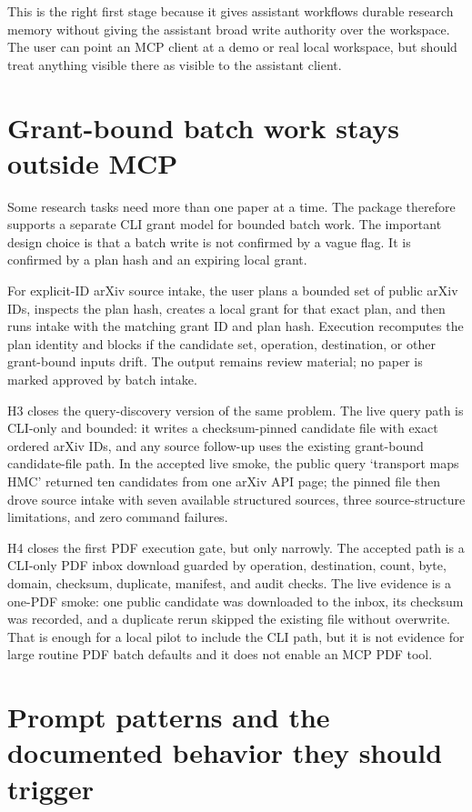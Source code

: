 \documentclass[11pt,a4paper,openany]{book}
\begin{document}
This is the right first stage because it gives assistant workflows durable
research memory without giving the assistant broad write authority over the
workspace. The user can point an MCP client at a demo or real local workspace,
but should treat anything visible there as visible to the assistant client.

\section{Grant-bound batch work stays outside MCP}

Some research tasks need more than one paper at a time. The package therefore
supports a separate CLI grant model for bounded batch work. The important design
choice is that a batch write is not confirmed by a vague flag. It is confirmed
by a plan hash and an expiring local grant.

For explicit-ID arXiv source intake, the user plans a bounded set of public
arXiv IDs, inspects the plan hash, creates a local grant for that exact plan, and
then runs intake with the matching grant ID and plan hash. Execution recomputes
the plan identity and blocks if the candidate set, operation, destination, or
other grant-bound inputs drift. The output remains review material; no paper is
marked approved by batch intake.

H3 closes the query-discovery version of the same problem. The live query path is
CLI-only and bounded: it writes a checksum-pinned candidate file with exact
ordered arXiv IDs, and any source follow-up uses the existing grant-bound
candidate-file path. In the accepted live smoke, the public query
`transport maps HMC' returned ten candidates from one arXiv API page; the pinned
file then drove source intake with seven available structured sources, three
source-structure limitations, and zero command failures.

H4 closes the first PDF execution gate, but only narrowly. The accepted path is a
CLI-only PDF inbox download guarded by operation, destination, count, byte,
domain, checksum, duplicate, manifest, and audit checks. The live evidence is a
one-PDF smoke: one public candidate was downloaded to the inbox, its checksum was
recorded, and a duplicate rerun skipped the existing file without overwrite. That
is enough for a local pilot to include the CLI path, but it is not evidence for
large routine PDF batch defaults and it does not enable an MCP PDF tool.

\section{Prompt patterns and the documented behavior they should trigger}
\end{document}
